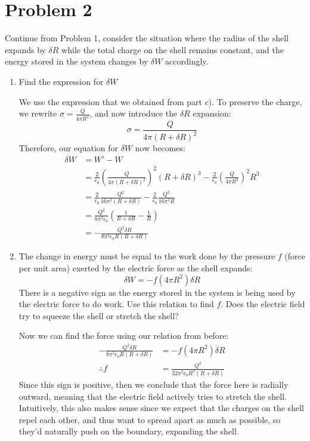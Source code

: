 \documentclass[10pt]{article}
\begin{document}
	\section*{Problem 2}
	Continue from Problem 1, consider the situation where the radius of the shell expands by $\delta R$ while the 
	total charge on the shell remains constant, and the energy stored in the system changes by $\delta W$ 
	accordingly. 
	\begin{enumerate}[label=\alph*)]
			\item Find the expression for $\delta W$

					\begin{solution}
							We use the expression that we obtained from part c). To preserve the charge, we 
							rewrite $\sigma = \frac{Q}{4 \pi R^2}$, and now introduce the $\delta R$ expansion:
							\[ \sigma = \frac{Q}{4 \pi (R + \delta R)^2}\]
							Therefore, our equation for $\delta W$ now becomes: 
							\begin{align*}
									\delta W &= W' - W \\
									&= \frac{2}{\epsilon_0}\left( \frac{Q}{4\pi (R + \delta R)^2} \right)^2
									(R+\delta R)^3 - \frac{2}{\epsilon_0}\left( \frac{Q}{4\pi R^2} \right)^2 R^3\\
									&= \frac{2}{\epsilon_0}\frac{Q^2}{16\pi^2(R + \delta R)} -
									\frac{2}{\epsilon_0}\frac{Q^2}{16\pi^2R}\\
									&= \frac{Q^2}{8\pi^2\epsilon_0}\left( \frac{1}{R + \delta R} - 
									\frac{1}{R} \right)  \\
									&= -\frac{Q^2\delta R}{8\pi^2\epsilon_0 R(R + \delta R)}
							\end{align*}
					\end{solution}
			\item The change in energy must be equal to the work done by the pressure $f$ (force per unit area) 
					exerted by the electric force as the shell expands:
					\[ \delta W = -f(4\pi R^2)\delta R\]
					There is a negative sign as the energy stored in the system is being used by the electric 
					force to do work. Use this relation to find $f$. Does the electric field try to squeeze the 
					shell or stretch the shell?

					\begin{solution}
							Now we can find the force using our relation from before:
							\begin{align*}
									-\frac{Q^2\delta R}{8\pi^2\epsilon_0R(R + \delta R)} &= -f(4 \pi R^2) 
									\delta R\\
									\therefore f &= \frac{Q^2}{32 \pi^2 \epsilon_0R^3(R + \delta R)}
							\end{align*}
							Since this sign is positive, then we conclude that the force here is radially 
							outward, meaning that the electric field actively tries to stretch the shell.
							Intuitively, this also makes sense since we expect that the charges on the shell
							repel each other, and thus want to spread apart as much as possible, so they'd 
							naturally push on the boundary, expanding the shell. 
					\end{solution}
	\end{enumerate}
\end{document}
